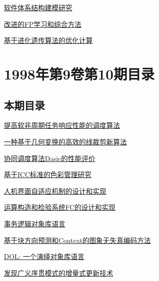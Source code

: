 \documentclass[a4paper]{article}
\begin{document}
\href{http://www.jos.org.cn/ch/reader/download_pdf.aspx?file_no=19981113&year_id=1998&quarter_id=11&falg=1}{软件体系结构建模研究}

\href{http://www.jos.org.cn/ch/reader/download_pdf.aspx?file_no=19981114&year_id=1998&quarter_id=11&falg=1}{改进的FP学习和综合方法}

\href{http://www.jos.org.cn/ch/reader/download_pdf.aspx?file_no=19981115&year_id=1998&quarter_id=11&falg=1}{基于进化遗传算法的优化计算}


\section{\textbf{1998年第9卷第10期目录}}
\subsection{本期目录}
\href{http://www.jos.org.cn/ch/reader/download_pdf.aspx?file_no=19981001&year_id=1998&quarter_id=10&falg=1}{提高软非周期任务响应性能的调度算法}

\href{http://www.jos.org.cn/ch/reader/download_pdf.aspx?file_no=19981002&year_id=1998&quarter_id=10&falg=1}{一种基于几何变换的高效的线裁剪新算法}

\href{http://www.jos.org.cn/ch/reader/download_pdf.aspx?file_no=19981003&year_id=1998&quarter_id=10&falg=1}{协同调度算法Dasic的性能评价}

\href{http://www.jos.org.cn/ch/reader/download_pdf.aspx?file_no=19981004&year_id=1998&quarter_id=10&falg=1}{基于ICC标准的色彩管理研究}

\href{http://www.jos.org.cn/ch/reader/download_pdf.aspx?file_no=19981005&year_id=1998&quarter_id=10&falg=1}{人机界面自适应机制的设计和实现}

\href{http://www.jos.org.cn/ch/reader/download_pdf.aspx?file_no=19981006&year_id=1998&quarter_id=10&falg=1}{运算构造和检验系统FC的设计和实现}

\href{http://www.jos.org.cn/ch/reader/download_pdf.aspx?file_no=19981007&year_id=1998&quarter_id=10&falg=1}{事务逻辑对象库语言}

\href{http://www.jos.org.cn/ch/reader/download_pdf.aspx?file_no=19981008&year_id=1998&quarter_id=10&falg=1}{基于块方向预测和Context的图象无失真编码方法}

\href{http://www.jos.org.cn/ch/reader/download_pdf.aspx?file_no=19981009&year_id=1998&quarter_id=10&falg=1}{DOL: 一个演绎对象库语言}

\href{http://www.jos.org.cn/ch/reader/download_pdf.aspx?file_no=19981010&year_id=1998&quarter_id=10&falg=1}{发现广义序贯模式的增量式更新技术}
\end{document}
